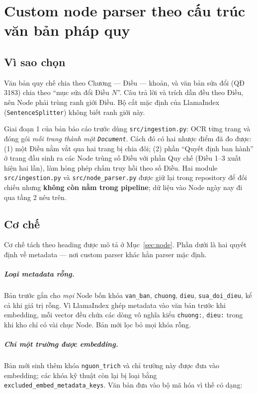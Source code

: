 \chapter{Custom node parser theo cấu trúc văn bản pháp quy}
\label{ch:node-parser}

\section{Vì sao chọn}

Văn bản quy chế chia theo Chương --- Điều --- khoản, và văn bản sửa đổi (QĐ 3183) chia theo ``mục sửa
đổi Điều $N$''. Câu trả lời và trích dẫn đều theo Điều, nên Node phải trùng ranh giới Điều. Bộ cắt mặc
định của LlamaIndex (\texttt{SentenceSplitter}) không biết ranh giới này.

Giai đoạn 1 của bản báo cáo trước dùng \texttt{src/ingestion.py}: OCR từng trang và đóng gói
\emph{mỗi trang thành một \texttt{Document}}. Cách đó có hai nhược điểm đã đo được: (1) một Điều
nằm vắt qua hai trang bị chia đôi; (2) phần ``Quyết định ban hành'' ở trang đầu sinh ra các Node
trùng số Điều với phần Quy chế (Điều 1--3 xuất hiện hai lần), làm hỏng phép chấm truy hồi theo số
Điều. Hai module \texttt{src/ingestion.py} và \texttt{src/node\_parser.py} được giữ lại trong
repository để đối chiếu nhưng \textbf{không còn nằm trong pipeline}; dữ liệu vào Node ngày nay đi
qua tầng 2 nêu trên.

\section{Cơ chế}

Cơ chế tách theo heading được mô tả ở Mục~\ref{sec:node}. Phần dưới là hai quyết định về metadata ---
nơi custom parser khác hẳn parser mặc định.

\paragraph{Loại metadata rỗng.} Bản trước gắn cho \emph{mọi} Node bốn khóa \texttt{van\_ban},
\texttt{chuong}, \texttt{dieu}, \texttt{sua\_doi\_dieu}, kể cả khi giá trị rỗng. Vì LlamaIndex ghép
metadata vào văn bản trước khi embedding, mỗi vector đều chứa các dòng vô nghĩa kiểu
\texttt{chuong:}, \texttt{dieu:} trong khi kho chỉ có vài chục Node. Bản mới lọc bỏ mọi khóa rỗng.

\paragraph{Chỉ một trường được embedding.} Bản mới sinh thêm khóa \texttt{nguon\_trich} và chỉ trường
này được đưa vào embedding; các khóa kỹ thuật còn lại bị loại bằng
\texttt{excluded\_embed\_metadata\_keys}. Văn bản đưa vào bộ mã hóa vì thế có dạng:

